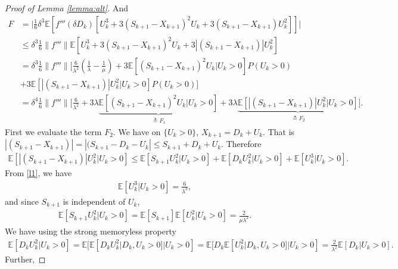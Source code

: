 \documentclass[11pt,letterpaper,reqno]{article}
\theoremstyle{thmstyleone}%
\theoremstyle{thmstyletwo}%
\theoremstyle{thmstylethree}%
\numberwithin{equation}{section}
\begin{document}
\begin{proof}[Proof of Lemma \ref{lemma:alt}]
And
\begin{align}\label{lnD}
   F&= \bigg|\frac{1}{6}\delta^3 \mathbb E[f'''(\delta D_k) [U_k^3+3(S_{k+1}-X_{k+1})^2U_k+3(S_{k+1}-X_{k+1})U_k^2]] \bigg| \nonumber\\
    &\leq \delta^3 \frac{1}{6}\| f'''\|\mathbb E\left[U_k^3+3(S_{k+1}-X_{k+1})^2U_k+3|(S_{k+1}-X_{k+1})|U_k^2\right] \nonumber\\
    &=\delta^3 \frac{1}{6}\| f'''\|\bigg[\frac{6}{\lambda^2}\left(\frac{1}{\lambda}-\frac{1}{\mu}\right)+3\mathbb E[(S_{k+1}-X_{k+1})^2U_k|U_k>0]P(U_k>0) \nonumber \\
    &+3 \mathbb E[|(S_{k+1}-X_{k+1})|U_k^2|U_k>0]P(U_k>0) \bigg] \nonumber\\
    &=\delta^4 \frac{1}{6}\| f'''\|\bigg[\frac{6}{\lambda^2}+3\lambda\underbrace{\mathbb E[(S_{k+1}-X_{k+1})^2U_k|U_k>0]}_{\triangleq F_1}+3\lambda\underbrace{ \mathbb E[|(S_{k+1}-X_{k+1})|U_k^2|U_k>0]}_{\triangleq F_2}\bigg].
\end{align}
First we evaluate the term $F_2$. We have on $\{U_k >0\}$, $X_{k+1}=D_k+U_k$. That is  $|(S_{k+1}-X_{k+1})|=|(S_{k+1}-D_k-U_k| \leq S_{k+1}+D_k+U_k $. Therefore 
\begin{align*}
   \mathbb E[|(S_{k+1}-X_{k+1})|U_k^2|U_k>0] \leq \mathbb E[S_{k+1}U_k^2|U_k>0] +\mathbb E[D_{k}U_k^2|U_k>0]+\mathbb E[U_k^3|U_k>0].
\end{align*}
From \eqref{l1}, we have
\begin{align*}
    \mathbb E[U_k^3|U_k>0] =\frac{6}{\lambda^3},
\end{align*}
and since $S_{k+1}$ is independent of $U_k$,
\begin{align*}
    \mathbb E[S_{k+1}U_k^2|U_k>0]=\mathbb E[S_{k+1}]\mathbb E[U_k^2|U_k>0]=\frac{2}{\mu \lambda^2}.
\end{align*}
We have using the strong memoryless property
\begin{align*}
      \mathbb E[D_{k}U_k^2|U_k>0]=\mathbb E[\mathbb E[D_kU_k^2|D_k,U_k>0]|U_k>0]=\mathbb E[D_k\mathbb E[U_k^2|D_k,U_k>0]|U_k>0]=\frac{2}{\lambda^2}\mathbb E[D_{k}|U_k>0].
\end{align*}
Further,

\end{proof}
\end{document}
